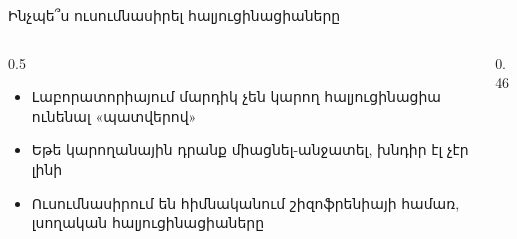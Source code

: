 \begin{frame}{Ինչպե՞ս ուսումնասիրել հալյուցինացիաները}
  \begin{columns}[c]
    \begin{column}{0.5\textwidth}
      \begin{itemize}
        \item Լաբորատորիայում մարդիկ չեն կարող հալյուցինացիա ունենալ «պատվերով»
        \item Եթե կարողանային դրանք միացնել-անջատել, խնդիր էլ չէր լինի
        \item Ուսումնասիրում են հիմնականում շիզոֆրենիայի համառ, լսողական հալյուցինացիաները
      \end{itemize}
    \end{column}
    \begin{column}{0.46\textwidth}
    \end{column}
  \end{columns}
\end{frame}

